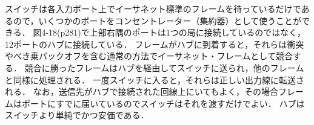 \documentclass[a4paper]{ltjsarticle}
\begin{document}
スイッチは各入力ポート上でイーサネット標準のフレームを待っているだけであるので，いくつかのポートをコンセントレーター（集約器）として使うことができる．
図4-18(p281)で上部右隅のポートは1つの局に接続しているのではなく，12ポートのハブに接続している．
フレームがハブに到着すると，それらは衝突やべき乗バックオフを含む通常の方法でイーサネット・フレームとして競合する．
競合に勝ったフレームはハブを経由してスイッチに送られ，他のフレームと同様に処理される．
一度スイッチに入ると，それらは正しい出力線に転送される．
なお，送信先がハブで接続された回線上にいてもよく，その場合フレームはポートにすでに届いているのでスイッチはそれを渡すだけでよい．
ハブはスイッチより単純でかつ安価である．
\end{document}

